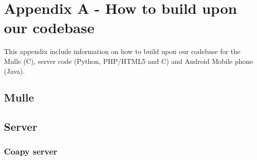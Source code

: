 


\section{Appendix A - How to build upon our codebase}
This appendix include information on how to build upon our codebase for the Mulle (C), server code (Python, PHP/HTML5 and C) and Android Mobile phone (Java).
\subsection{Mulle}
\subsection{Server}
\subsubsection{Coapy server}
